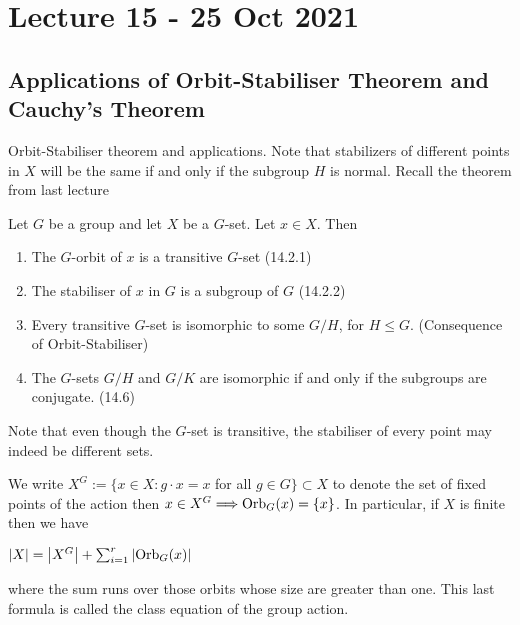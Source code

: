 \section{Lecture 15 - 25 Oct 2021}
\subsection{Applications of Orbit-Stabiliser Theorem and Cauchy's Theorem}
Orbit-Stabiliser theorem and applications.
Note that stabilizers of different points in $X$ will be the same if and only if the
subgroup $H$ is normal. Recall the theorem from last lecture

\begin{theorem}
  Let $G$ be a group and let $X$ be a $G$-set. Let $x\in X$. Then
  \begin{enumerate}
    \item The $G$-orbit of $x$ is a transitive $G$-set (14.2.1)
    \item The stabiliser of $x$ in $G$ is a subgroup of $G$ (14.2.2)
    \item Every transitive $G$-set is isomorphic to some $G/H$, for $H\leq G$. (Consequence of Orbit-Stabiliser)
    \item The $G$-sets $G/H$ and $G/K$ are isomorphic if and only if the subgroups are
      conjugate. (14.6)
  \end{enumerate}
\end{theorem}
Note that even though the $G$-set is transitive, the stabiliser of every point may indeed be
different sets.

\begin{definition}
    We write $X^G:=\{x \in X: g \cdot x=x$ for all $g \in G\} \subset X$ to denote the set of fixed points of the action then $x \in X^G \Longrightarrow \operatorname*{Orb}_G(x)=\{x\}$. In particular, if $X$ is finite then we have
    \begin{center}
    $
    |X|=\left|X^G\right|+\sum_{i=1}^r\left|\operatorname*{Orb}_{G}(x)\right|
    $
    \end{center}
    where the sum runs over those orbits whose size are greater than one. This last formula is called the class equation of the group action. \label{classeq}
\end{definition}

